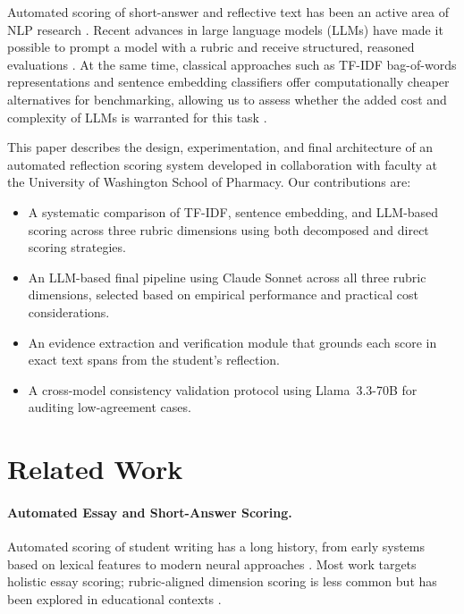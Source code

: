 \documentclass[11pt]{article}
\begin{document}
Automated scoring of short-answer and reflective text has been an active area of NLP research \citep{burstein2003automated, shermis2013handbook}. Recent advances in large language models (LLMs) have made it possible to prompt a model with a rubric and receive structured, reasoned evaluations \citep{brown2020language, wei2022chain}. At the same time, classical approaches such as TF-IDF bag-of-words representations and sentence embedding classifiers offer computationally cheaper alternatives for benchmarking, allowing us to assess whether the added cost and complexity of LLMs is warranted for this task \citep{reimers2019sentence}.

This paper describes the design, experimentation, and final architecture of an automated reflection scoring system developed in collaboration with faculty at the University of Washington School of Pharmacy. Our contributions are:

\begin{itemize}[leftmargin=1.5em]
    \item A systematic comparison of TF-IDF, sentence embedding, and LLM-based scoring across three rubric dimensions using both decomposed and direct scoring strategies.
    \item An LLM-based final pipeline using Claude Sonnet across all three rubric dimensions, selected based on empirical performance and practical cost considerations.
    \item An evidence extraction and verification module that grounds each score in exact text spans from the student's reflection.
    \item A cross-model consistency validation protocol using Llama~3.3-70B for auditing low-agreement cases.
\end{itemize}

\section{Related Work}

\paragraph{Automated Essay and Short-Answer Scoring.}
Automated scoring of student writing has a long history, from early systems based on lexical features \citep{page1966imminence} to modern neural approaches \citep{taghipour2016neural}. Most work targets holistic essay scoring; rubric-aligned dimension scoring is less common but has been explored in educational contexts \citep{mathias2020happy}.
\end{document}
